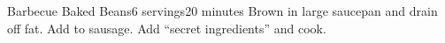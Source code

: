 \begin{recipe}{Barbecue Baked Beans}{6 servings}{20 minutes}
Brown in large saucepan and drain off fat.
Add to sausage.
Add ``secret ingredients'' and cook.
\end{recipe}
